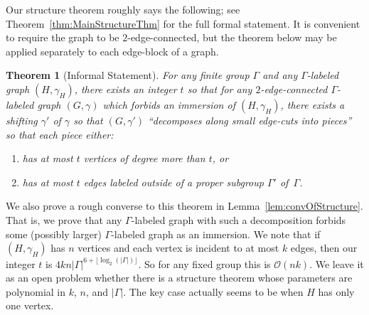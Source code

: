 \documentclass[11pt]{article}
\newtheorem{thm}{Theorem}[section]
\theoremstyle{definition}
\newcommand{\RMin}[1]{\todo[inline,bordercolor=white,color=DeepCarrotOrange,backgroundcolor=BananaYellow!40,textcolor=DeepCarrotOrange,size=\footnotesize]{\textsf{RM: #1}}}
\newcommand{\CMin}[1]{\todo[inline,bordercolor=white,color=Magenta,backgroundcolor=CornflowerBlue!40,textcolor=black,size=\footnotesize]{\textsf{CM: #1}}}
\begin{document}
Our structure theorem roughly says the following; see Theorem~\ref{thm:MainStructureThm} for the full formal statement. It is convenient to require the graph to be $2$-edge-connected, but the theorem below may be applied separately to each edge-block of a graph.

\begin{thm}[Informal Statement]
\label{thm:informalStructure}
For any finite group $\Gamma$ and any $\Gamma$-labeled graph $(H, \gamma_H)$, there exists an integer $t$ so that for any $2$-edge-connected $\Gamma$-labeled graph $(G, \gamma)$ which forbids an immersion of $(H, \gamma_H)$, there exists a shifting $\gamma'$ of $\gamma$ so that $(G, \gamma')$ ``decomposes along small edge-cuts into pieces'' so that each piece either:\begin{enumerate}
\item has at most $t$ vertices of degree more than $t$, or
\item has at most $t$ edges labeled outside of a proper subgroup $\Gamma'$ of~$\Gamma$.
\end{enumerate}
\end{thm}

We also prove a rough converse to this theorem in Lemma~\ref{lem:convOfStructure}. That is, we prove that any $\Gamma$-labeled graph with such a decomposition forbids some (possibly larger) $\Gamma$-labeled graph as an immersion. We note that if $(H, \gamma_H)$ has $n$ vertices and each vertex is incident to at most $k$ edges, then our integer $t$ is $4kn|\Gamma|^{6+\lfloor \log_2(|\Gamma|)\rfloor}$. So for any fixed group this is $\mathcal{O}(nk)$. We leave it as an open problem whether there is a structure theorem whose parameters are polynomial in $k$, $n$, and $|\Gamma|$. The key case actually seems to be when $H$ has only one vertex.

\end{document}
